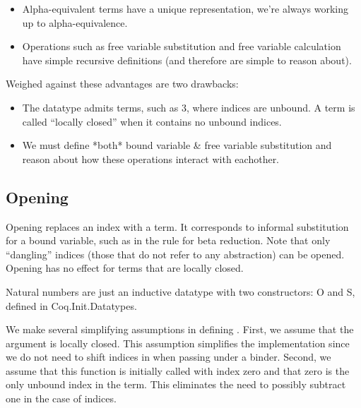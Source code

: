 \documentclass[12pt]{report}
\begin{document}
\begin{itemize}
\item  Alpha-equivalent terms have a unique representation, 
       we're always working up to alpha-equivalence.

\item  Operations such as free variable substitution and free
       variable calculation have simple recursive definitions
      (and therefore are simple to reason about).

\end{itemize}


    Weighed against these advantages are two drawbacks:

\begin{itemize}
\item  The  datatype admits terms, such as  3, where
       indices are unbound. 
       A term is called ``locally closed'' when it contains 
       no unbound indices. 

\item  We must define *both* bound variable \& free variable 
       substitution and reason about how these operations 
       interact with eachother.

\end{itemize}



\begin{coqdoccode}
\coqdocemptyline
\end{coqdoccode}
\subsection{Opening}



 Opening replaces an index with a term. It corresponds to informal
    substitution for a bound variable, such as in the rule for beta
    reduction. Note that only ``dangling'' indices (those that do not
    refer to any abstraction) can be opened. Opening has no effect for
    terms that are locally closed.


    Natural numbers are just an inductive datatype with two
    constructors: O and S, defined in Coq.Init.Datatypes.


    We make several simplifying assumptions in defining .
    First, we assume that the argument  is locally closed.  This
    assumption simplifies the implementation since we do not need to
    shift indices in  when passing under a binder.  Second, we
    assume that this function is initially called with index zero and
    that zero is the only unbound index in the term.  This eliminates
    the need to possibly subtract one in the case of indices.
\end{document}
